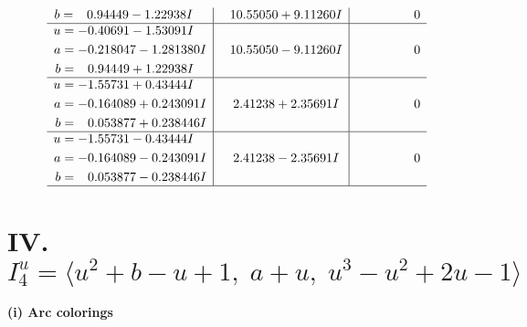 \documentclass[1p]{elsarticle_modified}
\theoremstyle{definition}
\begin{document}
$$\begin{array}{c|c|c}
\begin{aligned}
b &= \phantom{-}0.94449 - 1.22938 I\end{aligned}
 & \phantom{-}10.55050 + 9.11260 I & \phantom{-0.000000 } 0 \\ \hline\begin{aligned}
u &= -0.40691 - 1.53091 I \\
a &= -0.218047 - 1.281380 I \\
b &= \phantom{-}0.94449 + 1.22938 I\end{aligned}
 & \phantom{-}10.55050 - 9.11260 I & \phantom{-0.000000 } 0 \\ \hline\begin{aligned}
u &= -1.55731 + 0.43444 I \\
a &= -0.164089 + 0.243091 I \\
b &= \phantom{-}0.053877 + 0.238446 I\end{aligned}
 & \phantom{-}2.41238 + 2.35691 I & \phantom{-0.000000 } 0 \\ \hline\begin{aligned}
u &= -1.55731 - 0.43444 I \\
a &= -0.164089 - 0.243091 I \\
b &= \phantom{-}0.053877 - 0.238446 I\end{aligned}
 & \phantom{-}2.41238 - 2.35691 I & \phantom{-0.000000 } 0\\
 \hline 
 \end{array}$$\newpage\newpage\renewcommand{\arraystretch}{1}
\centering \section*{IV. $I^u_{4}= \langle u^2+b- u+1,\;a+u,\;u^3- u^2+2 u-1 \rangle$}
\flushleft \textbf{(i) Arc colorings}\\
\end{document}
